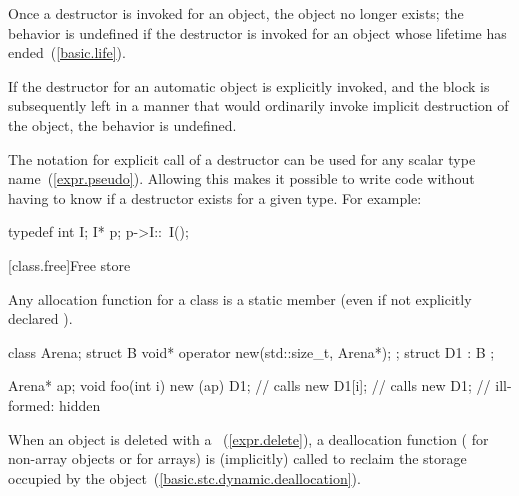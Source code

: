 \pnum
Once a destructor is invoked for an object, the object no longer exists;
the behavior is undefined if the destructor is invoked
for an object whose lifetime has ended~(\ref{basic.life}).
\begin{example}
If the destructor for an automatic object is explicitly invoked,
and the block is subsequently left in a manner that would ordinarily
invoke implicit destruction of the object, the behavior is undefined.
\end{example}

\pnum
\begin{note}
%
The notation for explicit call of a destructor can be used for any scalar type
name~(\ref{expr.pseudo}).
Allowing this makes it possible to write code without having to know if a
destructor exists for a given type.
For example:
\begin{codeblock}
typedef int I;
I* p;
p->I::~I();
\end{codeblock}
\end{note}

[class.free]{Free store}%
%

\pnum
{}
Any allocation function for a class
is a static member (even if not explicitly declared
).

\pnum
\begin{example}
\begin{codeblock}
class Arena;
struct B {
  void* operator new(std::size_t, Arena*);
};
struct D1 : B {
};

Arena*  ap;
void foo(int i) {
  new (ap) D1;      // calls 
  new D1[i];        // calls 
  new D1;           // ill-formed:  hidden
}
\end{codeblock}
\end{example}

\pnum
{}%
When an object is deleted with a
~(\ref{expr.delete}),
a deallocation function
%
(
%
for non-array objects or
%
for arrays) is (implicitly) called to reclaim the storage occupied by
the object~(\ref{basic.stc.dynamic.deallocation}).

